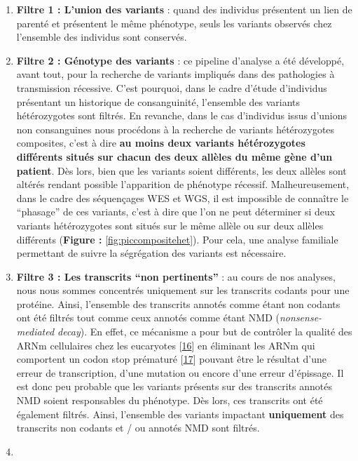 \documentclass[12pt,a4paper,twoside]{ugathesis}
\begin{document}
\begin{enumerate}
\def\labelenumi{\arabic{enumi}.}
\item
  \textbf{Filtre 1 : L'union des variants} : quand des individus
  présentent un lien de parenté et présentent le même phénotype, seuls
  les variants observés chez l'ensemble des individus sont conservés.
\item
  \textbf{Filtre 2 : Génotype des variants} : ce pipeline d'analyse a
  été développé, avant tout, pour la recherche de variants impliqués
  dans des pathologies à transmission récessive. C'est pourquoi, dans le
  cadre d'étude d'individus présentant un historique de consanguinité,
  l'ensemble des variants hétérozygotes sont filtrés. En revanche, dans
  le cas d'individus issus d'unions non consanguines nous procédons à la
  recherche de variants hétérozygotes composites, c'est à dire
  \textbf{au moins deux variants hétérozygotes différents situés sur
  chacun des deux allèles du même gène d'un patient}. Dès lors, bien que
  les variants soient différents, les deux allèles sont altérés rendant
  possible l'apparition de phénotype récessif. Malheureusement, dans le
  cadre des séquençages WES et WGS, il est impossible de connaître le
  ``phasage'' de ces variants, c'est à dire que l'on ne peut déterminer
  si deux variants hétérozygotes sont situés sur le même allèle ou sur
  deux allèles différents (\textbf{Figure : }\ref{fig:piccompositehet}).
  Pour cela, une analyse familiale permettant de suivre la ségrégation
  des variants est nécessaire.
\item
  \textbf{Filtre 3 : Les transcrits ``non pertinents''} : au cours de
  nos analyses, nous nous sommes concentrés uniquement sur les
  transcrits codants pour une protéine. Ainsi, l'ensemble des transcrits
  annotés comme étant non codants ont été filtrés tout comme ceux
  annotés comme étant NMD (\emph{nonsense-mediated decay}). En effet, ce
  mécanisme a pour but de contrôler la qualité des ARNm cellulaires chez
  les eucaryotes {[}\protect\hyperlink{ref-Chang2007}{16}{]} en
  éliminant les ARNm qui comportent un codon stop prématuré
  {[}\protect\hyperlink{ref-Baker2004}{17}{]} pouvant être le résultat
  d'une erreur de transcription, d'une mutation ou encore d'une erreur
  d'épissage. Il est donc peu probable que les variants présents sur des
  transcrits annotés NMD soient responsables du phénotype. Dès lors, ces
  transcrits ont été également filtrés. Ainsi, l'ensemble des variants
  impactant \textbf{uniquement} des transcrits non codants et / ou
  annotés NMD sont filtrés.
\item

\end{enumerate}
\end{document}
